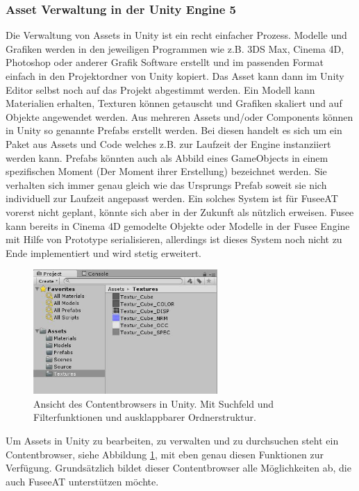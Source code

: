 \documentclass[pagesize, paper=a4, fontsize=12pt, titlepage=true, headings=small, headnosepline, abstractoff, liststotoc, nochapterprefix, plainheadsepline, twoside]{scrreprt}
\begin{document}
\subsubsection{Asset Verwaltung in der Unity Engine 5}
Die Verwaltung von Assets in Unity ist ein recht einfacher Prozess. Modelle und Grafiken werden in den jeweiligen Programmen wie z.B. 3DS Max, Cinema 4D, Photoshop oder anderer Grafik Software erstellt und im passenden Format einfach in den Projektordner von Unity kopiert. Das Asset kann dann im Unity Editor selbst noch auf das Projekt abgestimmt werden. Ein Modell kann Materialien erhalten, Texturen können getauscht und Grafiken skaliert und auf Objekte angewendet werden. Aus mehreren Assets und/oder Components können in Unity so genannte Prefabs erstellt werden. Bei diesen handelt es sich um ein Paket aus Assets und Code welches z.B. zur Laufzeit der Engine instanziiert werden kann. Prefabs könnten auch als Abbild eines GameObjects in einem spezifischen Moment (Der Moment ihrer Erstellung) bezeichnet werden. Sie verhalten sich immer genau gleich wie das Ursprungs Prefab soweit sie nich individuell zur Laufzeit angepasst werden. Ein solches System ist für FuseeAT vorerst nicht geplant, könnte sich aber in der Zukunft als nützlich erweisen. Fusee kann bereits in Cinema 4D gemodelte Objekte oder Modelle in der Fusee Engine mit Hilfe von Prototype serialisieren, allerdings ist dieses System noch nicht zu Ende implementiert und wird stetig erweitert.

\begin{figure}[ht]
	\centering
	\includegraphics[width=7cm]{Bilder/uContentbrowser.jpg}
	\caption{Ansicht des Contentbrowsers in Unity. Mit Suchfeld und Filterfunktionen und ausklappbarer Ordnerstruktur.}
	\label{UnityContentbrowser}
\end{figure}
Um Assets in Unity zu bearbeiten, zu verwalten und zu durchsuchen steht ein Contentbrowser, siehe Abbildung \ref{UnityContentbrowser}, mit eben genau diesen Funktionen zur Verfügung. Grundsätzlich bildet dieser Contentbrowser alle Möglichkeiten ab, die auch FuseeAT unterstützen möchte.
\end{document}
